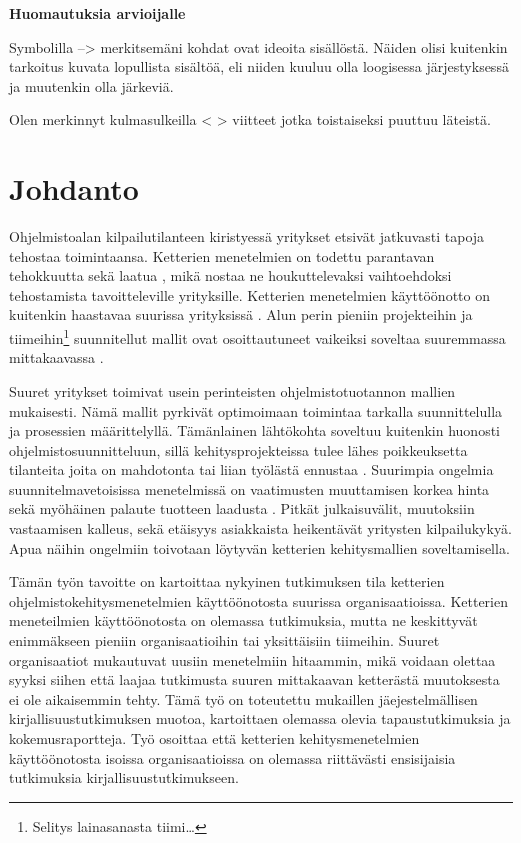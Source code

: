
\textbf{Huomautuksia arvioijalle}

Symbolilla --> merkitsemäni kohdat ovat ideoita sisällöstä. Näiden olisi
kuitenkin tarkoitus kuvata lopullista sisältöä, eli niiden kuuluu olla
loogisessa järjestyksessä ja muutenkin olla järkeviä.

Olen merkinnyt kulmasulkeilla < > viitteet jotka toistaiseksi puuttuu läteistä.

\newpage

\section{Johdanto}

Ohjelmistoalan kilpailutilanteen kiristyessä yritykset etsivät jatkuvasti tapoja
tehostaa toimintaansa. Ketterien menetelmien on todettu parantavan tehokkuutta
sekä laatua \citep{Livermore2008}, mikä nostaa ne houkuttelevaksi vaihtoehdoksi
tehostamista tavoitteleville yrityksille. Ketterien menetelmien käyttöönotto on
kuitenkin haastavaa suurissa yrityksissä \citep{Dyba2009}. Alun perin
pieniin projekteihin ja tiimeihin\footnote{Selitys lainasanasta tiimi\ldots}
suunnitellut mallit ovat osoittautuneet vaikeiksi soveltaa suuremmassa
mittakaavassa \citep{Boehm2005}.

Suuret yritykset toimivat usein perinteisten ohjelmistotuotannon mallien
mukaisesti. Nämä mallit pyrkivät optimoimaan toimintaa tarkalla suunnittelulla
ja prosessien määrittelyllä. Tämänlainen lähtökohta soveltuu kuitenkin huonosti
ohjelmistosuunnitteluun, sillä kehitysprojekteissa tulee lähes poikkeuksetta
tilanteita joita on mahdotonta tai liian työlästä ennustaa \citep[ss. 97-100]{Schwaber2002}.
Suurimpia ongelmia suunnitelmavetoisissa menetelmissä on vaatimusten muuttamisen
korkea hinta sekä myöhäinen palaute tuotteen laadusta \citep{Petersen2010}.
Pitkät julkaisuvälit, muutoksiin vastaamisen kalleus, sekä etäisyys asiakkaista
heikentävät yritysten kilpailukykyä. Apua näihin ongelmiin toivotaan löytyvän
ketterien kehitysmallien soveltamisella.

Tämän työn tavoitte on kartoittaa nykyinen tutkimuksen tila ketterien
ohjelmistokehitysmenetelmien käyttöönotosta suurissa organisaatioissa. Ketterien
meneteilmien käyttöönotosta on olemassa tutkimuksia, mutta ne keskittyvät
enimmäkseen pieniin organisaatioihin tai yksittäisiin tiimeihin. Suuret
organisaatiot mukautuvat uusiin menetelmiin hitaammin, mikä voidaan olettaa
syyksi siihen että laajaa tutkimusta suuren mittakaavan ketterästä muutoksesta
ei ole aikaisemmin tehty. Tämä työ on toteutettu mukaillen jäejestelmällisen
kirjallisuustutkimuksen muotoa, kartoittaen olemassa olevia tapaustutkimuksia ja
kokemusraportteja. Työ osoittaa että ketterien kehitysmenetelmien käyttöönotosta
isoissa organisaatioissa on olemassa riittävästi ensisijaisia tutkimuksia
kirjallisuustutkimukseen.

